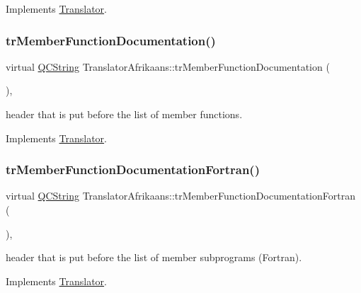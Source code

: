 Implements \mbox{\hyperlink{class_translator}{Translator}}.

\mbox{\label{class_translator_afrikaans_a4a84da9672dc21f1de8afa357f700f1f}} 
\subsubsection{\texorpdfstring{trMemberFunctionDocumentation()}{trMemberFunctionDocumentation()}}
{\footnotesize\ttfamily virtual \mbox{\hyperlink{class_q_c_string}{Q\+C\+String}} Translator\+Afrikaans\+::tr\+Member\+Function\+Documentation (\begin{DoxyParamCaption}{ }\end{DoxyParamCaption})\hspace{0.3cm}{\ttfamily [inline]}, {\ttfamily [virtual]}}

header that is put before the list of member functions. 

Implements \mbox{\hyperlink{class_translator}{Translator}}.

\mbox{\label{class_translator_afrikaans_a13bc5a75f5bb4640799185b8e50a85d1}} 
\subsubsection{\texorpdfstring{trMemberFunctionDocumentationFortran()}{trMemberFunctionDocumentationFortran()}}
{\footnotesize\ttfamily virtual \mbox{\hyperlink{class_q_c_string}{Q\+C\+String}} Translator\+Afrikaans\+::tr\+Member\+Function\+Documentation\+Fortran (\begin{DoxyParamCaption}{ }\end{DoxyParamCaption})\hspace{0.3cm}{\ttfamily [inline]}, {\ttfamily [virtual]}}

header that is put before the list of member subprograms (Fortran). 

Implements \mbox{\hyperlink{class_translator}{Translator}}.

